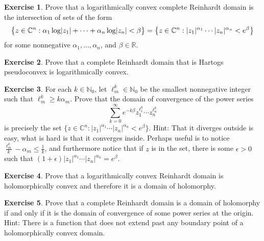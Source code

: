 \documentclass[12pt,openany]{book}
\newcommand{\avoidbreak}{\postdisplaypenalty=100}
\newcommand{\sabs}[1]{\lvert {#1} \rvert}
\newcommand{\C}{{\mathbb{C}}}
\newcommand{\R}{{\mathbb{R}}}
\newcommand{\N}{{\mathbb{N}}}
\theoremstyle{plain}
\theoremstyle{remark}
\theoremstyle{definition}
\newenvironment{exbox}{%
    \def\FrameCommand{\vrule width 1pt \relax\hspace{10pt}}%
    \MakeFramed {\advance \hsize -\width \FrameRestore}%
}{%
    \endMakeFramed
}
\theoremstyle{exercise}
\newtheorem{exercise}{Exercise}[section]
\theoremstyle{example}
\begin{document}
\begin{exbox}
\begin{exercise}
Prove that a logarithmically convex complete Reinhardt domain
is the intersection of sets of the form
\begin{equation*}
\bigl\{ z \in \C^n : \alpha_1 \log \sabs{z_1} + \cdots + \alpha_n \log
\sabs{z_n} < \beta  \bigr\} 
=
\bigl\{ z \in \C^n : \sabs{z_1}^{\alpha_1} \cdots \sabs{z_n}^{\alpha_n}
< e^\beta \bigr\} 
\avoidbreak
\end{equation*}
for some nonnegative $\alpha_1,\ldots,\alpha_n$, and $\beta \in \R$.
\end{exercise}

\begin{exercise}
Prove that a complete Reinhardt domain that is Hartogs
pseudoconvex is logarithmically convex.
\end{exercise}

\begin{exercise}
For each $k \in \N_0$, let $\ell_m^k \in \N_0$ be the smallest nonnegative integer such that
$\ell_m^k \geq k \alpha_m$.
Prove that the domain of convergence of the power series
\begin{equation*}
\sum_{k=0}^\infty e^{-k\beta}
z_1^{\ell_1^k}
\cdots
z_n^{\ell_n^k}
\end{equation*}
is precisely the set
$\bigl\{ z \in \C^n :
\sabs{z_1}^{\alpha_1} \cdots \sabs{z_n}^{\alpha_n}
< e^\beta \bigr\}$.
Hint: That it diverges outside is easy, what is hard is that it converges
inside.  Perhaps useful is to notice
$\frac{\ell_m^k}{k}-\alpha_m \leq \frac{1}{k}$, and furthermore
notice that if $z$ is in the set, there is some $\epsilon > 0$ such that
$(1+\epsilon)\sabs{z_1}^{\alpha_1} \cdots \sabs{z_n}^{\alpha_n} =
e^{\beta}$.
\end{exercise}

\begin{exercise}
Prove that a logarithmically convex Reinhardt domain is holomorphically
convex and therefore it is a domain of holomorphy.
\end{exercise}

\begin{exercise}
Prove that a complete Reinhardt domain is
a domain of holomorphy if and only if it is the
domain of convergence of some power series at the origin.  Hint: There is a
function that does not extend past any boundary point of a holomorphically
convex domain.
\end{exercise}
\end{exbox}
\end{document}
